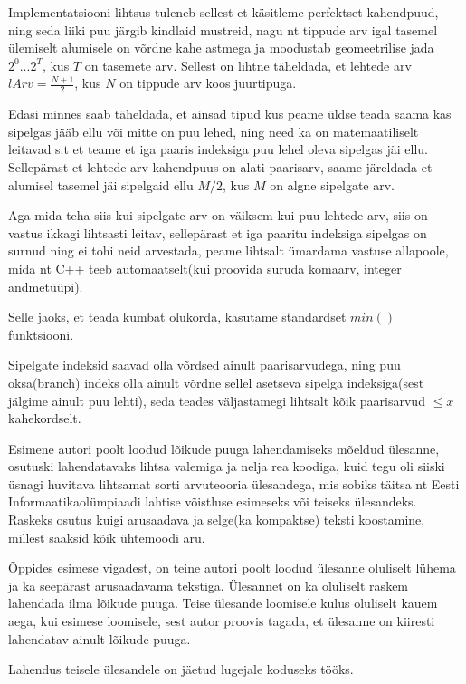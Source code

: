 \documentclass{trkut}
\begin{document}
    Implementatsiooni lihtsus tuleneb sellest et käsitleme perfektset kahendpuud, ning seda liiki puu järgib kindlaid mustreid, nagu nt tippude arv igal tasemel ülemiselt alumisele on võrdne kahe astmega ja moodustab geomeetrilise jada $2^0...2^T$, kus $T$ on tasemete arv. 
    Sellest on lihtne täheldada, et lehtede arv $lArv = \frac{N+1}{2}$, kus $N$ on tippude arv koos juurtipuga.

    Edasi minnes saab täheldada, et ainsad tipud kus peame üldse teada saama kas sipelgas jääb ellu või mitte on puu lehed, ning need ka on matemaatiliselt leitavad s.t et teame et iga paaris indeksiga puu lehel oleva sipelgas jäi ellu. Sellepärast et lehtede arv kahendpuus on alati paarisarv, saame järeldada et alumisel tasemel jäi sipelgaid ellu $M/2$, kus $M$ on algne sipelgate arv.

    Aga mida teha siis kui sipelgate arv on väiksem kui puu lehtede arv, siis on vastus ikkagi lihtsasti leitav, sellepärast et iga paaritu indeksiga sipelgas on surnud ning ei tohi neid arvestada, peame lihtsalt ümardama vastuse allapoole, mida nt C++ teeb automaatselt(kui proovida suruda komaarv, integer andmetüüpi).

    Selle jaoks, et teada kumbat olukorda, kasutame standardset $min()$ funktsiooni.

    Sipelgate indeksid saavad olla võrdsed ainult paarisarvudega, ning puu oksa(branch) indeks olla ainult võrdne sellel asetseva sipelga indeksiga(sest jälgime ainult puu lehti), seda teades väljastamegi lihtsalt kõik paarisarvud $\le x$ kahekordselt.


    

Esimene autori poolt loodud lõikude puuga lahendamiseks mõeldud ülesanne, osutuski lahendatavaks lihtsa valemiga ja nelja rea koodiga, kuid tegu oli siiski üsnagi huvitava lihtsamat sorti arvuteooria ülesandega, mis sobiks täitsa nt Eesti Informaatikaolümpiaadi lahtise võistluse esimeseks või teiseks ülesandeks.
Raskeks osutus kuigi arusaadava ja selge(ka kompaktse) teksti koostamine, millest saaksid kõik ühtemoodi aru.  

Õppides esimese vigadest, on teine autori poolt loodud ülesanne oluliselt lühema ja ka seepärast arusaadavama tekstiga. 
Ülesannet on ka oluliselt raskem lahendada ilma lõikude puuga.
Teise ülesande loomisele kulus oluliselt kauem aega, kui esimese loomisele, sest autor proovis tagada, et ülesanne on kiiresti lahendatav ainult lõikude puuga. 

Lahendus teisele ülesandele on jäetud lugejale koduseks tööks.
\end{document}
